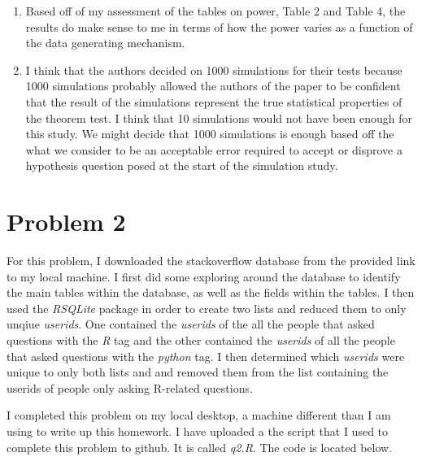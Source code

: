 \documentclass{article}\usepackage[]{graphicx}\usepackage[]{color}
\begin{document}
\begin{enumerate}
  \item Based off of my assessment of the tables on power, Table 2 and Table 4, the results do make sense to me in terms of how the power varies as a function of the data generating mechanism.
  \item I think that the authors decided on 1000 simulations for their tests because 1000 simulations probably allowed the authors of the paper to be confident that the result of the simulations represent the true statistical properties of the theorem test.  I think that 10 simulations would not have been enough for this study.  We might decide that 1000 simulations is enough based off the what we consider to be an acceptable error required to accept or disprove a hypothesis question posed at the start of the simulation study.
\end{enumerate}
\section{Problem 2}
For this problem, I downloaded the stackoverflow database from the provided link to my local machine.  I first did some exploring around the database to identify the main tables within the database, as well as the fields within the tables.  I then used the \emph{RSQLite} package in order to create two lists and reduced them to only unqiue \emph{userids}.  One contained the \emph{userids} of the all the people that asked questions with the \emph{R} tag and the other contained the \emph{userids} of all the people that asked questions with the \emph{python} tag.  I then determined which \emph{userids} were unique to only both lists and and removed them from the list containing the userids of people only asking R-related questions. 
\par I completed this problem on my local desktop, a machine different than I am using to write up this homework.  I have uploaded a the script that I used to complete this problem to github.  It is called \emph{q2.R}.  The code is located below.
\end{document}
